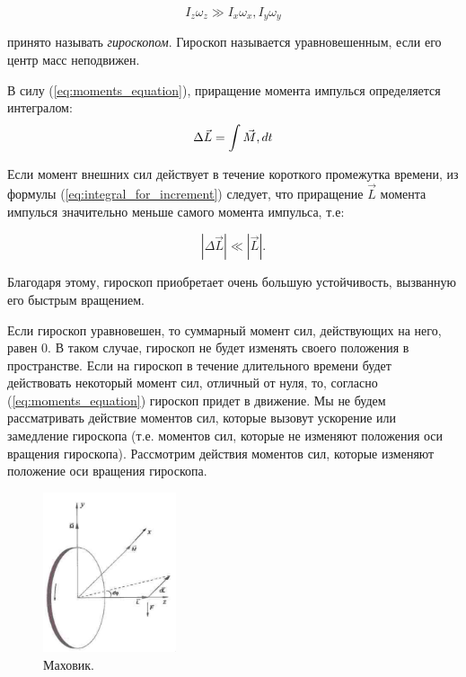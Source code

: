 \documentclass[a4paper, 12pt]{article}
\begin{document}
	$$I_{z}\omega_{z} \gg I_{x}\omega_{x}, I_{y}\omega_{y}$$

принято называть \textit{гироскопом}. Гироскоп называется уравновешенным, если его центр масс неподвижен.

В силу (\ref{eq:moments_equation}), приращение момента импулься определяется интегралом:
\begin{equation}
	\Delta\vec{L} =  \int\vec{M}\\,dt
	\label{eq:integral_for_increment}
\end{equation}

Если момент внешних сил действует в течение короткого промежутка времени, из формулы (\ref{eq:integral_for_increment}) следует, что приращение $\vec{L}$ момента импулься значительно меньше самого момента импульса, т.е:

\begin{equation}
	\left| \Delta\vec{L} \right| \ll \left| \vec{L} \right|.
\end{equation}

Благодаря этому, гироскоп приобретает очень большую устойчивость, вызванную его быстрым вращением.

Если гироскоп уравновешен, то суммарный момент сил, действующих на него, равен 0. В таком случае, гироскоп не будет изменять своего положения в пространстве. Если на гироскоп в течение длительного времени будет действовать некоторый момент сил, отличный от нуля, то, согласно (\ref{eq:moments_equation}) гироскоп придет в движение. Мы не будем рассматривать действие моментов сил, которые вызовут ускорение или замедление гироскопа (т.е. моментов сил, которые не изменяют положения оси вращения гироскопа). Рассмотрим действия моментов сил, которые изменяют положение оси вращения гироскопа.

\begin{figure}
	\vspace{-2.5ex}
	\includegraphics[width = 0.35\textwidth]{flywhell.png}
	\caption{Маховик.}
	\label{fig:flywheel}
\end{figure}
\end{document}
